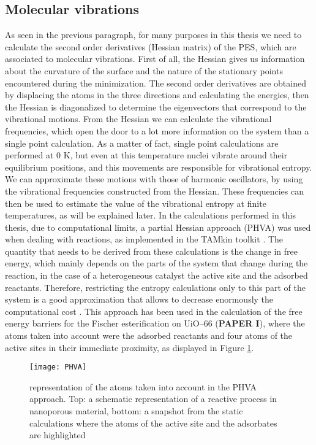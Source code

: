 \subsection*{Molecular vibrations}
As seen in the previous paragraph, for many purposes in this thesis we need to calculate the second order derivatives (Hessian matrix) of the PES, which are associated to molecular vibrations. First of all, the Hessian gives us information about the curvature of the surface and the nature of the stationary points encountered during the minimization. The second order derivatives are obtained by displacing the atoms in the three directions and calculating the energies, then the Hessian is diagonalized to determine the eigenvectors that correspond to the vibrational motions. 
From the Hessian we can calculate the vibrational frequencies, which open the door to a lot more information on the system than a single point calculation. As a matter of fact, single point calculations are performed at 0 K, but even at this temperature nuclei vibrate around their equilibrium positions, and this movements are responsible for vibrational entropy. We can approximate these motions with those of harmonic oscillators, by using the vibrational frequencies constructed from the Hessian. 
\npar
These frequencies can then be used to estimate the value of the vibrational entropy at finite temperatures, as will be explained later. In the calculations performed in this thesis, due to computational limits, a partial Hessian approach (PHVA) was used when dealing with reactions, as implemented in the TAMkin toolkit \cite{Ghysels2010}. The quantity that needs to be derived from these calculations is the change in free energy, which mainly depends on the parts of the system that change during the reaction, in the case of a heterogeneous catalyst the active site and the adsorbed reactants. Therefore, restricting the entropy calculations only to this part of the system is a good approximation that allows to decrease enormously the computational cost \cite{Ghysels2007}. This approach has been used in the calculation of the free energy barriers for the Fischer esterification on UiO--66 (\textbf{PAPER I}), where the atoms taken into account were the adsorbed reactants and four atoms of the active sites in their immediate proximity, as displayed in Figure \ref{fig:PHVA}.

\begin{figure}[!htbp]
	\centering
 	\texttt{[image: PHVA]}
	\caption{representation of the atoms taken into account in the PHVA approach. Top: a schematic representation of a reactive process in nanoporous material, bottom: a snapshot from the static calculations where the atoms of the active site and the adsorbates are highlighted}
 \label{fig:PHVA}
\end{figure}


